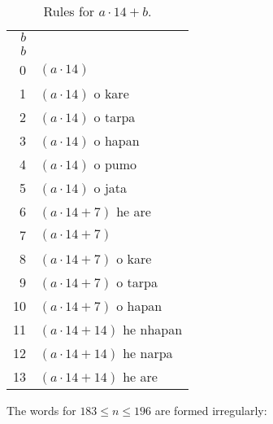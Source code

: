 \documentclass{book}
\begin{document}
\begin{longtabu}[c]{|r|X|}
    \caption{Rules for $a \cdot 14 + b$.}
    \centering
    
    \\ \hline
    $b$ & \\
    \hline
    \endfirsthead
    
    \hline
    $b$ & \\
    \hline
    \endhead
    
    \hline
    \endfoot
    
    \hline
    \endlastfoot
    
    0 & $(a \cdot 14)$ \\
    1 & $(a \cdot 14)$ o kare \\
    2 & $(a \cdot 14)$ o tarpa \\
    3 & $(a \cdot 14)$ o hapan \\
    4 & $(a \cdot 14)$ o pumo \\
    5 & $(a \cdot 14)$ o jata \\
    6 & $(a \cdot 14 + 7)$ he are \\
    7 & $(a \cdot 14 + 7)$ \\
    8 & $(a \cdot 14 + 7)$ o kare \\
    9 & $(a \cdot 14 + 7)$ o tarpa \\
    10 & $(a \cdot 14 + 7)$ o hapan \\
    11 & $(a \cdot 14 + 14)$ he nhapan \\
    12 & $(a \cdot 14 + 14)$ he narpa \\
    13 & $(a \cdot 14 + 14)$ he are \\
\end{longtabu}

The words for $183 \le n \le 196$ are formed irregularly:
\end{document}
